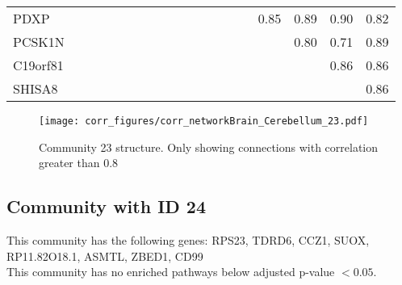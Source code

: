 \begin{longtable}{lrrrrrrrrrrrrrrrrrr}
PDXP          &            &            &               &             &              &             &                &                     &             &             &               &              &              &            &         0.85 &           0.89 &         0.90 &         0.82 \\
PCSK1N        &            &            &               &             &              &             &                &                     &             &             &               &              &              &            &              &           0.80 &         0.71 &         0.89 \\
C19orf81      &            &            &               &             &              &             &                &                     &             &             &               &              &              &            &              &                &         0.86 &         0.86 \\
SHISA8        &            &            &               &             &              &             &                &                     &             &             &               &              &              &            &              &                &              &         0.86 \\
\end{longtable}


\begin{figure}[h!]
\centering
\texttt{[image: corr\_figures/corr\_networkBrain\_Cerebellum\_23.pdf]}
\caption{Community 23 structure. Only showing connections with correlation greater than 0.8}
\end{figure}




\subsection*{Community with ID 24}
This community has the following genes: RPS23, TDRD6, CCZ1, SUOX, RP11.82O18.1, ASMTL, ZBED1, CD99
\\
This community has no enriched pathways below adjusted p-value $< 0.05$.

